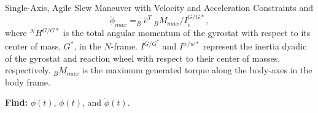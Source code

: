 \documentclass{beamer}
\begin{document}
\begin{frame}
\begin{block}{ Single-Axis, Agile Slew Maneuver with Velocity and Acceleration Constraints}
 and
 \begin{equation}\label{phiddotmax}
\ddot{\phi}_{max}=_B\hat{e}^T\  _BM_{max}/I_{\hat{e}}^{G/G*},
\end{equation}
where $^NH^{G/G*}$ is the total angular momentum of the gyrostat with respect to its center of mass, $G^*$, in the $N$-frame. $I^{G/G^*}$ and $I^{w/w*}$ represent the inertia dyadic of the gyrostat and reaction wheel with respect to their center of masses, respectively. $_BM_{max}$ is the maximum generated torque along the body-axes in the body frame.\\
\vspace{0.5in}

{\bf Find:} $\phi(t)$, $\dot{\phi}(t)$, and $\ddot{\phi}(t)$.
\end{block}
\end{frame}
\end{document}
